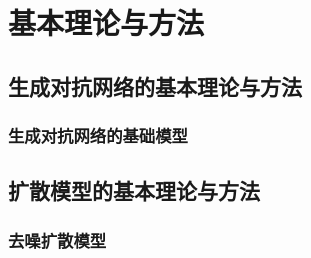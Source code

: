 \chapter{基本理论与方法}
\label{chapter2}


\section{生成对抗网络的基本理论与方法}
\subsection{生成对抗网络的基础模型}\label{s2:gan_base}


\section{扩散模型的基本理论与方法}
\subsection{去噪扩散模型}\label{s2_ddpm}
